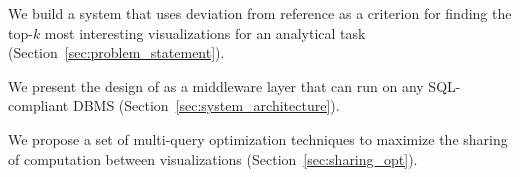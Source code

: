 \begin{denselist}
  \item We build a system that uses deviation from reference as a criterion for finding the
  top-$k$ most interesting visualizations for an analytical task (Section~\ref{sec:problem_statement}).

  \item We present the design of \SeeDB as a middleware layer that can run on any SQL-compliant DBMS 
  (Section~\ref{sec:system_architecture}).
  
  \item We propose a set of multi-query optimization techniques to maximize the sharing of 
  computation between visualizations (Section~\ref{sec:sharing_opt}).


\end{denselist}
